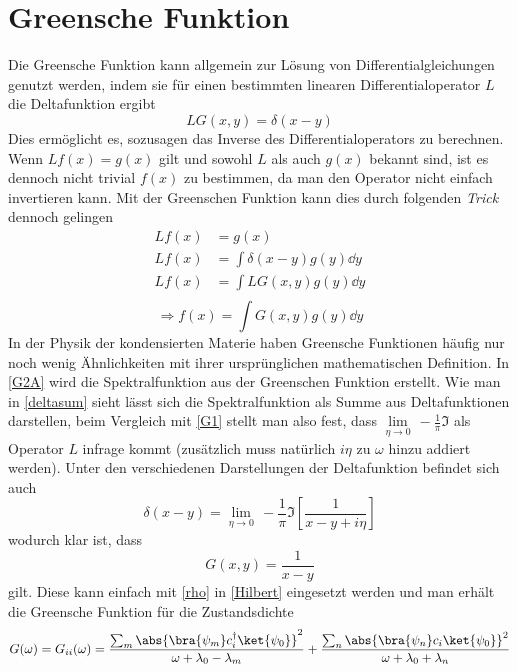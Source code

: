 \section{Greensche Funktion}
Die Greensche Funktion kann allgemein zur Lösung von Differentialgleichungen genutzt werden, indem sie für einen bestimmten linearen Differentialoperator $ L $ die Deltafunktion ergibt
\begin{equation}\label{G1}
LG(x,y) = \delta(x-y)
\end{equation}
Dies ermöglicht es, sozusagen das Inverse des Differentialoperators zu berechnen. Wenn $ L f(x) = g(x) $ gilt und sowohl $ L $ als auch $ g(x) $ bekannt sind, ist es dennoch nicht trivial $ f(x) $ zu bestimmen, da man den Operator nicht einfach invertieren kann. Mit der Greenschen Funktion kann dies durch folgenden \emph{Trick} dennoch gelingen
\begin{align*}
L f(x) &= g(x)\\
L f(x) &= \int \delta(x-y)g(y)\dd{y}\\
L f(x) &= \int L G(x,y)g(y)\dd{y}\\
\end{align*}
\begin{equation}\label{Hilbert}
\Rightarrow f(x)  = \int G(x,y) g(y) \dd{y}
\end{equation}
In der Physik der kondensierten Materie haben Greensche Funktionen häufig nur noch wenig Ähnlichkeiten mit ihrer ursprünglichen mathematischen Definition.
In \eqref{G2A} wird die Spektralfunktion aus der Greenschen Funktion erstellt. Wie man in \eqref{deltasum} sieht lässt sich die Spektralfunktion als Summe aus Deltafunktionen darstellen, beim Vergleich mit \eqref{G1} stellt man also fest, dass $ \lim\limits_{\eta \rightarrow 0}\,-\frac{1}{\pi}\Im $ als Operator $ L $ infrage kommt (zusätzlich muss natürlich $ i\eta $ zu $ \omega $ hinzu addiert werden). Unter den verschiedenen Darstellungen der Deltafunktion befindet sich auch 
\begin{equation}\label{delta}
\delta(x - y) =\lim\limits_{\eta \rightarrow 0}\,-\frac{1}{\pi}\Im\left[ \frac{1}{x - y +i\eta}\right] 
\end{equation}
wodurch klar ist, dass
\begin{equation}\label{G}
G(x,y) = \frac{1}{x - y}
\end{equation}
gilt. Diese kann einfach mit \eqref{rho} in \eqref{Hilbert} eingesetzt werden und man erhält die Greensche Funktion für die Zustandsdichte
\begin{equation}\label{Grho}
G(\omega) = G_{ii}(\omega) = \frac{\sum_{m}\abs{\bra{\psi_m}c^\dagger_i\ket{\psi_0}}^2}{\omega +\lambda_0 -\lambda_m } + \frac{\sum_{n}\abs{\bra{\psi_n}c_i\ket{\psi_0}}^2}{\omega + \lambda_0 +\lambda_n}
\end{equation}
